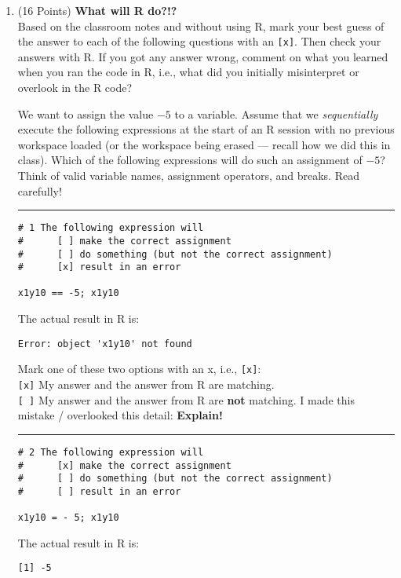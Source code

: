\documentclass[12pt,letterpaper,final]{article}\usepackage[]{graphicx}\usepackage[]{xcolor}
\begin{document}
\begin{enumerate}

\item (16 Points) {\bf What will R do?!?} \\
Based on the classroom notes and without using R, mark your best guess of the 
answer to each of the following questions with an \verb|[x]|.
Then check your answers with R. If you got any answer wrong, comment on what 
you learned when you ran the code in R, i.e., what did you initially
misinterpret or overlook in the R code?

We want to assign the value $-5$ to a variable. 
Assume that we {\em sequentially} execute the following expressions 
at the start of an R session with no 
previous workspace loaded (or the workspace being erased ---
recall how we did this in class). Which of the following
expressions will do such an assignment of $-5$? 
Think of valid variable names, assignment operators,
and breaks. Read carefully! \\


\hrule


\begin{verbatim}
# 1 The following expression will
#      [ ] make the correct assignment
#      [ ] do something (but not the correct assignment)
#      [x] result in an error

x1y10 == -5; x1y10
\end{verbatim}

The actual result in R is: 
\begin{verbatim}
Error: object 'x1y10' not found
\end{verbatim}


Mark one of these two options with an x, i.e., \verb|[x]|: \\
\verb|[x]| My answer and the answer from R are matching. \\
\verb|[ ]| My answer and the answer from R are {\bf not} matching. 
I made this mistake / overlooked this detail: {\bf Explain!} \\


\hrule


\begin{verbatim}
# 2 The following expression will
#      [x] make the correct assignment
#      [ ] do something (but not the correct assignment)
#      [ ] result in an error

x1y10 = - 5; x1y10
\end{verbatim}

The actual result in R is: 
\begin{verbatim}
[1] -5
\end{verbatim}


\end{enumerate}
\end{document}
